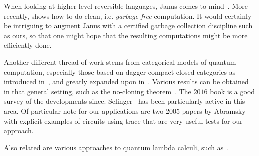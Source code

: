 \documentclass[sigplan,10pt,review,anonymous]{acmart}
\begin{document}
When looking at higher-level reversible languages, Janus
comes to mind~\cite{lutz1982janus}.  More recently, \cite{Yokoyama:2008:PRP}
shows how to do clean, i.e. \emph{garbage free} computation. It
would certainly be intriguing to augment Janus with a certified
garbage collection discipline such as ours, so that one might hope
that the resulting computations might be more efficiently done.

Another different thread of work stems from categorical models
of quantum computation, especially those based on dagger
compact closed categories as introduced
in~\cite{Abramsky:2004:CSQ:1018438.1021878}, and greatly
expanded upon in~\cite{abramsky2009categorical}.  Various
results can be obtained in that general setting, such as the
no-cloning theorem~\cite{abramsky2009no}. The $2016$ book
\cite{chiribella2016quantum} is a good survey of the
developments since. Selinger~\cite{selinger2007dagger,Selinger:2011:FDH:1942319.1942398}
has been particularly active in this area. Of particular
note for our applications are two 2005 papers by Abramsky
\cite{abramsky2005structural,dblp:conf/calco/abramsky05}
with explicit examples of circuits using trace that are very useful tests
for our approach.

Also related are various approaches to quantum lambda
calculi, such as~\cite{dblp:journals/mscs/selingerv06,vantonder:2004,dowek2017lineal}.





\end{document}
